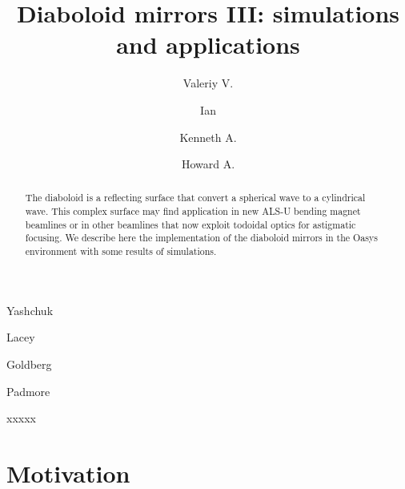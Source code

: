 \documentclass{iucr}              %
\begin{document}




\title{Diaboloid mirrors III: simulations and applications}

\author[a]{Valeriy V.}{Yashchuk}
\author[a]{Ian}{Lacey}
\author[a]{Kenneth A.}{Goldberg}
\author[a]{Howard A.}{Padmore}


\begin{synopsis}
xxxxx
\end{synopsis}

\begin{abstract}
The diaboloid is a reflecting surface that convert a spherical wave to a cylindrical wave. This complex surface may find application in new ALS-U bending magnet beamlines or in other  beamlines that now exploit todoidal optics for astigmatic focusing. We describe here the implementation of the diaboloid mirrors in the Oasys environment with some results of  simulations. 
\end{abstract}

\section{Motivation}
\end{document}
